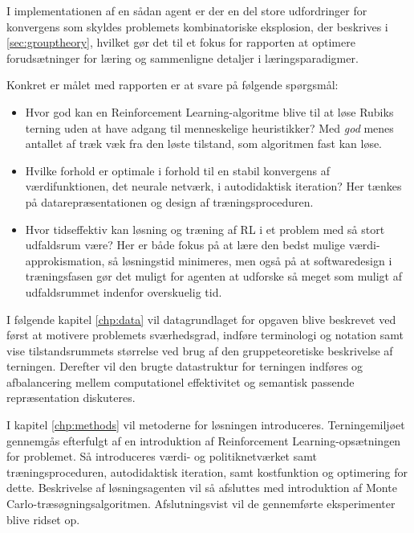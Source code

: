 \documentclass[../main.tex]{subfiles}
\begin{document}
I implementationen af en sådan agent er der en del store udfordringer for konvergens som skyldes problemets kombinatoriske eksplosion, der beskrives i \ref{sec:grouptheory}, hvilket gør det til et fokus for rapporten at optimere forudsætninger for læring og sammenligne detaljer i læringsparadigmer.


Konkret er målet med rapporten er at svare på følgende spørgsmål:
\begin{itemize}
	\item Hvor god kan en Reinforcement Learning-algoritme blive til at løse Rubiks terning uden at have adgang til menneskelige heuristikker? Med \textit{god} menes antallet af træk væk fra den løste tilstand, som algoritmen fast kan løse.
	\item Hvilke forhold er optimale i forhold til en stabil konvergens af værdifunktionen, det neurale netværk, i autodidaktisk iteration? Her tænkes på datarepræsentationen og design af træningsproceduren.
	\item Hvor tidseffektiv kan løsning og træning af RL i et problem med så stort udfaldsrum være? Her er både fokus på  at lære den bedst mulige værdi-approkismation, så løsningstid minimeres, men også på at softwaredesign i træningsfasen gør det muligt for agenten at udforske så meget som muligt af udfaldsrummet indenfor overskuelig tid.
\end{itemize}
\noindent
I følgende kapitel \eqref{chp:data} vil datagrundlaget for opgaven blive beskrevet ved først at motivere problemets sværhedsgrad, indføre terminologi og notation samt vise tilstandsrummets størrelse ved brug af den gruppeteoretiske beskrivelse af terningen. Derefter vil den brugte datastruktur for terningen indføres og afbalancering mellem computationel effektivitet og semantisk passende repræsentation diskuteres.

I kapitel \ref{chp:methods} vil metoderne for løsningen introduceres. Terningemiljøet gennemgås efterfulgt af en introduktion af Reinforcement Learning-opsætningen for problemet. Så introduceres værdi- og politiknetværket samt træningsproceduren, autodidaktisk iteration, samt kostfunktion og optimering for dette. Beskrivelse af løsningsagenten vil så afsluttes med introduktion af Monte Carlo-træsøgningsalgoritmen. Afslutningsvist  vil de gennemførte eksperimenter blive ridset op.



 
\end{document}
